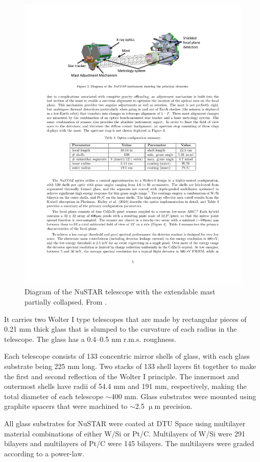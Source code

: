 \begin{figure}[!ht] %
	\centering	\includegraphics[width=0.8\linewidth]{figures/introduction/nustar.pdf}
	\caption{\footnotesize Diagram of the NuSTAR telescope with the extendable mast partially collapsed. From \cite{Harrison:2010gu}.}
	\label{fig:xrayperformance}
\end{figure}

It carries two Wolter I type telescopes that are made by rectangular pieces of 0.21 mm thick glass that is slumped to the curvature of each radius in the telescope\cite{Craig:2000fd,Hailey:1997ie}. The glass has a 0.4--0.5 nm r.m.s. roughness.

Each telescope consists of 133 concentric mirror shells of glass, with each glass substrate being 225 mm long. Two stacks of 133 shell layers fit together to make the first and second reflection of the Wolter I principle. The innermost and outermost shells have radii of 54.4 mm and 191 mm, respectively, making the total diameter of each telescope $\sim$400 mm. Glass substrates were mounted using graphite spacers that were machined to $\sim$2.5 $\upmu$m precision.

All glass substrates for NuSTAR were coated at DTU Space using multilayer material combinations of either W/Si or Pt/C. Multilayers of W/Si were 291 bilayers and multilayers of Pt/C were 145 bilayers. The multilayers were graded according to a power-law\cite{Christensen:1992uc}.

